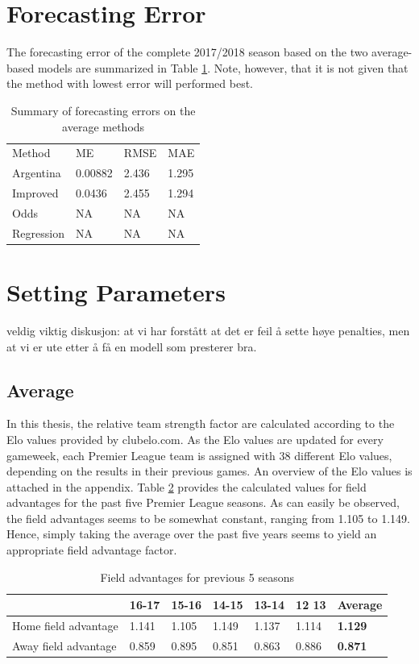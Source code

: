 \section{Forecasting Error}

The forecasting error of the complete 2017/2018 season based on the two average-based models are summarized in Table \ref{tab:accuracy_average}. Note, however, that it is not given that the method with lowest error will performed best. 

\begin{table}[H]
\centering
\caption{Summary of forecasting errors on the average methods}
\label{tab:accuracy_average}
\begin{tabular}{llll}
Method & ME & RMSE & MAE\\
Argentina & 0.00882 & 2.436 & 1.295 \\
Improved  & 0.0436  & 2.455 & 1.294 \\ 
Odds  & NA  & NA & NA   \\
Regression  & NA  & NA & NA \\
\end{tabular}
\end{table}

\section{Setting Parameters}
veldig viktig diskusjon: 
at vi har forstått at det er feil å sette høye penalties, men at vi er ute etter å få en modell som presterer bra. 


\subsection{Average}
In this thesis, the relative team strength factor are calculated according to the Elo values provided by clubelo.com. As the Elo values are updated for every gameweek, each Premier League team is assigned with 38 different Elo values, depending on the results in their previous games. An overview of the Elo values is attached in the appendix. 
\newpar
Table \ref{Field advantage} provides the calculated values for field advantages for the past five Premier League seasons. As can easily be observed, the field advantages seems to be somewhat constant, ranging from 1.105 to 1.149. Hence, simply taking the average over the past five years seems to yield an appropriate field advantage factor. 

\begin{table}[H]
\centering
\caption{Field advantages for previous 5 seasons}
\label{Field advantage}
\begin{tabular}{|l|l|l|l|l|l|l|}
\hline
          & 16-17    & 15-16    & 14-15    & 13-14    & 12 13 & \textbf{Average}   \\
          \hline
        
Home field advantage & 1.141 & 1.105 & 1.149 & 1.137 & 1.114 & \textbf{1.129} \\
\hline
Away field advantage & 0.859 & 0.895 & 0.851 & 0.863 & 0.886 & \textbf{0.871} \\
\hline
\end{tabular}
\end{table}

